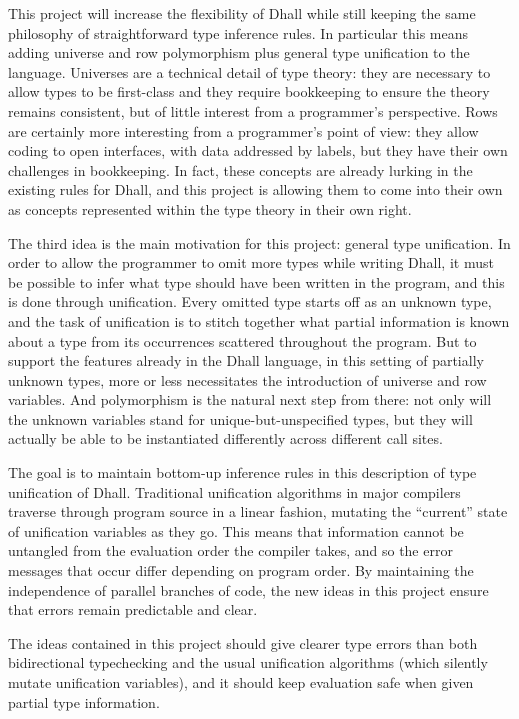 \documentclass[11pt, twoside, reqno]{book}
\begin{document}
This project will increase the flexibility of Dhall while still keeping the same philosophy of straightforward type inference rules.
In particular this means adding universe and row polymorphism plus general type unification to the language.
Universes are a technical detail of type theory: they are necessary to allow types to be first-class and they require bookkeeping to ensure the theory remains consistent, but of little interest from a programmer's perspective.
Rows are certainly more interesting from a programmer's point of view: they allow coding to open interfaces, with data addressed by labels, but they have their own challenges in bookkeeping.
In fact, these concepts are already lurking in the existing rules for Dhall, and this project is allowing them to come into their own as concepts represented within the type theory in their own right.

The third idea is the main motivation for this project: general type unification.
In order to allow the programmer to omit more types while writing Dhall, it must be possible to infer what type should have been written in the program, and this is done through unification.
Every omitted type starts off as an unknown type, and the task of unification is to stitch together what partial information is known about a type from its occurrences scattered throughout the program.
But to support the features already in the Dhall language, in this setting of partially unknown types, more or less necessitates the introduction of universe and row variables.
And polymorphism is the natural next step from there: not only will the unknown variables stand for unique-but-unspecified types, but they will actually be able to be instantiated differently across different call sites.

The goal is to maintain bottom-up inference rules in this description of type unification of Dhall.
Traditional unification algorithms in major compilers traverse through program source in a linear fashion, mutating the ``current'' state of unification variables as they go.
This means that information cannot be untangled from the evaluation order the compiler takes, and so the error messages that occur differ depending on program order.
By maintaining the independence of parallel branches of code, the new ideas in this project ensure that errors remain predictable and clear.

The ideas contained in this project should give clearer type errors than both bidirectional typechecking and the usual unification algorithms (which silently mutate unification variables), and it should keep evaluation safe when given partial type information.
\end{document}
